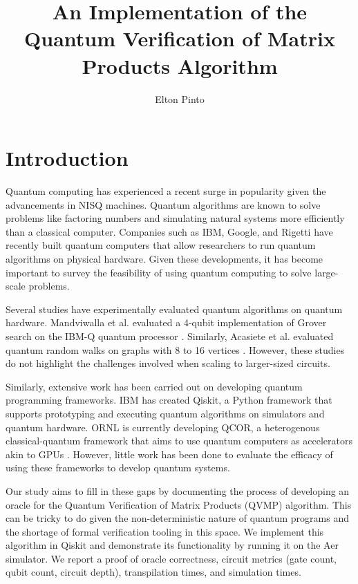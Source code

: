 \documentclass[11pt]{article}
\title{
  An Implementation of the Quantum Verification of Matrix Products Algorithm
}
\author{Elton Pinto}
\date{}
\theoremstyle{definition}
\theoremstyle{remark}
\begin{document}
\maketitle

\section{Introduction}

Quantum computing has experienced a recent surge in popularity given the
advancements in NISQ machines. Quantum algorithms are known to solve problems
like factoring numbers and simulating natural systems more efficiently than a
classical computer. Companies such as IBM, Google, and Rigetti have recently
built quantum computers that allow researchers to run quantum algorithms on
physical hardware. Given these developments, it has become important to survey
the feasibility of using quantum computing to solve large-scale problems.

Several studies have experimentally evaluated quantum algorithms on quantum
hardware. Mandviwalla et al. evaluated a 4-qubit implementation of Grover
search on the IBM-Q quantum processor \cite{mandviwalla_implementing_2018}.
Similarly, Acasiete et al. evaluated quantum random walks on graphs with 8 to
16 vertices \cite{acasiete_implementation_2020}. However, these studies do not
highlight the challenges involved when scaling to larger-sized circuits.

Similarly, extensive work has been carried out on developing quantum
programming frameworks. IBM has created Qiskit, a Python framework that
supports prototyping and executing quantum algorithms on simulators and quantum
hardware. ORNL is currently developing QCOR, a heterogenous classical-quantum
framework that aims to use quantum computers as accelerators akin to GPUs
\cite{mintz_qcor_2020}. However, little work has been done to evaluate the
efficacy of using these frameworks to develop quantum systems.

Our study aims to fill in these gaps by documenting the process of developing an
oracle for the Quantum Verification of Matrix Products (QVMP)
\cite{buhrman_quantum_2005}\cite{ambainis_quantum_2002} algorithm. This can be
tricky to do given the non-deterministic nature of quantum programs and the
shortage of formal verification tooling in this space. We implement this
algorithm in Qiskit and demonstrate its functionality by running it on the Aer
simulator. We report a proof of oracle correctness, circuit metrics (gate count,
qubit count, circuit depth), transpilation times, and simulation times.
\end{document}
